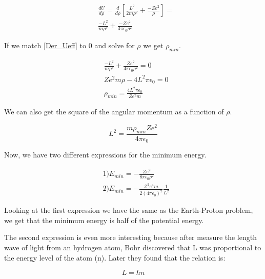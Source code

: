 \begin{equation}
    \label{Der_Ueff}
    \begin{split}
    &\frac{dU}{d\rho} =\frac{d}{d\rho}\left[ \frac{L^2}{2m\rho^2}+ \frac{ -Ze^2}{\rho}\right]=\\
    &\frac{-L^2}{m\rho^3}+\frac{-Ze^2}{4\pi\epsilon_0\rho^2}
    \end{split}
\end{equation}

If we match \ref{Der_Ueff} to 0 and solve for $\rho$ we get $\rho_{min}$.

\begin{equation}
    \label{rho_min}
    \begin{split}
    &\frac{-L^2}{m\rho^3}+\frac{Ze^2}{4\pi\epsilon_0\rho^2} = 0\\
    &Ze^2m\rho - 4 L^2\pi\epsilon_0 = 0\\
    &\rho_{min} = \frac{4L^2\pi\epsilon_0}{Ze^2m}
    \end{split}
\end{equation}

We can also get the square of the angular momentum as a function of $\rho$.

\begin{equation}
    \label{L_min}
    L^2 = \frac{m\rho_{min}Ze^2}{4\pi\epsilon_0}
\end{equation}

Now, we have two different expressions for the minimum energy.

\begin{equation}
    \label{E_min_EP}
    \begin{split}
    &1) E_{min} = -\frac{Ze^2}{8\pi\epsilon_0\rho^2}\\
    &2) E_{min} = -\frac{Z^2e^4m}{2(4\pi\epsilon_0)^2}\frac{1}{L^2}
    \end{split}
\end{equation}

Looking at the first expression we have the same as the Earth-Proton problem, we get that the minimum energy is half of the potential energy.

The second expression is even more interesting because after measure the length wave of light from an hydrogen atom, Bohr discovered that L was proportional to the energy level of the atom (n). Later they found that the relation is:

\begin{equation}
    \label{L_min}
    L = hn
\end{equation}

